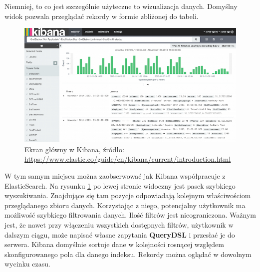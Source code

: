     Niemniej, to co jest szczególnie użyteczne to wizualizacja danych. Domyślny widok pozwala przeglądać 
    rekordy w formie zbliżonej do tabeli. 
    \begin{figure}[h]
        \centering
        \includegraphics[width=1.0\textwidth]{images/kibana_main_view}
        \caption[Ekran główny w Kibana]{
            Ekran główny w Kibana, źródło: \url{https://www.elastic.co/guide/en/kibana/current/introduction.html}
        }
        \label{chapter:application:elkstack:kibana:main_view}
    \end{figure}
    W tym samym miejscu można zaobserwować jak Kibana współpracuje z ElasticSearch. Na rysunku \ref{chapter:application:elkstack:kibana:main_view} po lewej stronie widoczny jest pasek szybkiego
    wyszukiwania. Znajdujące się tam pozycje odpowiadają kolejnym właściwościom przeglądanego zbioru danych.
    Korzystając z niego, potencjalny użytkownik ma możliwość szybkiego filtrowania danych. Ilość filtrów jest
    nieograniczona. Ważnym jest, że nawet przy włączeniu wszystkich dostępnych filtrów, użytkownik w dalszym ciągu, może napisać
    własne zapytania \textbf{QueryDSL} i przesłać je do serwera. Kibana domyślnie sortuje dane w kolejności
    rosnącej względem skonfigurowanego pola dla danego indeksu. Rekordy można oglądać w dowolnym wycinku czasu.
    

